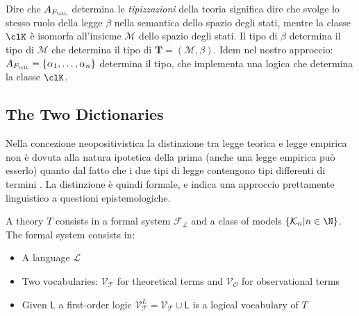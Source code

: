 Dire che $A_{F_\clL}$ determina le \emph{tipizzazioni} della teoria significa
dire che svolge lo stesso ruolo della legge $\beta$ nella semantica dello spazio degli
stati, mentre la classe $\clK$ è isomorfa all'insieme $\mathcal{M}$ dello spazio
degli stati. Il tipo di $\beta$ determina il tipo di $\mathcal{M}$ che determina il
tipo di $\mathbf{T} = (\mathcal{M}, \beta)$. Idem nel nostro approccio: $A_{F_\clL}
	= \{\alpha_1,\dots,\alpha_n\}$ determina il tipo, che implementa una logica che determina
la classe $\clK$.

\subsection{The Two Dictionaries}
Nella concezione neopositivistica la distinzione tra legge teorica e legge empirica non è dovuta alla natura ipotetica della prima (anche una legge empirica può esserlo) quanto dal fatto che i due tipi di legge contengono tipi differenti di termini \cite{?}. La distinzione è quindi formale, e indica una approccio prettamente linguistico a questioni epistemologiche.


\begin{definition} 
	A theory $T$ consists in a formal system $\mathcal{F_L}$ and a class of models $\{\mathcal{K}_n | n \in \N \}$. The formal system consists in:
	\begin{itemize}
		\item A language $\mathcal{L}$
		\item Two vocabularies: $\mathcal{V_T}$ for theoretical terms and $\mathcal{V_O}$ for observational terms 
		\item Given $\mathsf{L}$ a first-order logic $\mathcal{V}_{\mathcal{T}}^L = \mathcal{V_T} \cup \mathsf{L}$ is a logical vocabulary of $T$
	\end{itemize}    
\end{definition}

